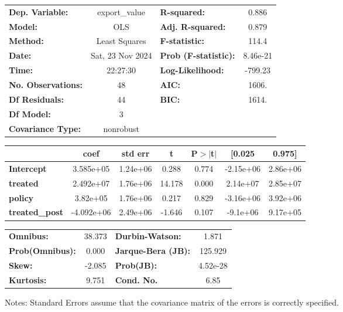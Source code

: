 \begin{center}
\begin{tabular}{lclc}
\toprule
\textbf{Dep. Variable:}    &  export\_value   & \textbf{  R-squared:         } &     0.886   \\
\textbf{Model:}            &       OLS        & \textbf{  Adj. R-squared:    } &     0.879   \\
\textbf{Method:}           &  Least Squares   & \textbf{  F-statistic:       } &     114.4   \\
\textbf{Date:}             & Sat, 23 Nov 2024 & \textbf{  Prob (F-statistic):} &  8.46e-21   \\
\textbf{Time:}             &     22:27:30     & \textbf{  Log-Likelihood:    } &   -799.23   \\
\textbf{No. Observations:} &          48      & \textbf{  AIC:               } &     1606.   \\
\textbf{Df Residuals:}     &          44      & \textbf{  BIC:               } &     1614.   \\
\textbf{Df Model:}         &           3      & \textbf{                     } &             \\
\textbf{Covariance Type:}  &    nonrobust     & \textbf{                     } &             \\
\bottomrule
\end{tabular}
\begin{tabular}{lcccccc}
                       & \textbf{coef} & \textbf{std err} & \textbf{t} & \textbf{P$> |$t$|$} & \textbf{[0.025} & \textbf{0.975]}  \\
\midrule
\textbf{Intercept}     &    3.585e+05  &     1.24e+06     &     0.288  &         0.774        &    -2.15e+06    &     2.86e+06     \\
\textbf{treated}       &    2.492e+07  &     1.76e+06     &    14.178  &         0.000        &     2.14e+07    &     2.85e+07     \\
\textbf{policy}        &     3.82e+05  &     1.76e+06     &     0.217  &         0.829        &    -3.16e+06    &     3.92e+06     \\
\textbf{treated\_post} &   -4.092e+06  &     2.49e+06     &    -1.646  &         0.107        &     -9.1e+06    &     9.17e+05     \\
\bottomrule
\end{tabular}
\begin{tabular}{lclc}
\textbf{Omnibus:}       & 38.373 & \textbf{  Durbin-Watson:     } &    1.871  \\
\textbf{Prob(Omnibus):} &  0.000 & \textbf{  Jarque-Bera (JB):  } &  125.929  \\
\textbf{Skew:}          & -2.085 & \textbf{  Prob(JB):          } & 4.52e-28  \\
\textbf{Kurtosis:}      &  9.751 & \textbf{  Cond. No.          } &     6.85  \\
\bottomrule
\end{tabular}
\end{center}

Notes: \newline
 [1] Standard Errors assume that the covariance matrix of the errors is correctly specified.